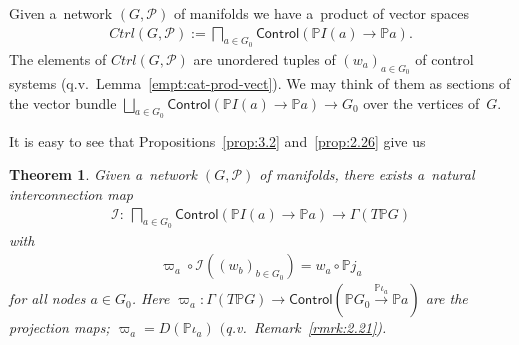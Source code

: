 \documentclass[10pt,a4paper]{amsart}
\numberwithin{equation}{section}
\newtheorem{Theorem}{Theorem}[section]
\renewcommand{\mathpzc}[1]{\mathit{#1}}
\begin{document}
\begin{Notation}
Given a~network $(G,{\mathcal P})$ of manifolds we have a~product of vector spaces
\begin{gather*}
\mathpzc{Ctrl}(G,{\mathcal P}):= \bigsqcap_{a\in G_0} \mathsf{Control}(\mathbb{P} I(a)\to \mathbb{P} a).
\end{gather*}
The elements of $\mathpzc{Ctrl}(G,{\mathcal P})$ are unordered tuples of $(w_a)_{a\in G_0}$ of control systems (q.v.\
Lem\-ma~\ref{empt:cat-prod-vect}).
We may think of them as sections of the vector bundle $\bigsqcup\limits_{a\in G_0}\mathsf{Control}(\mathbb{P} I(a)\to
\mathbb{P} a) \to G_0$ over the vertices of~$G$.
\end{Notation}
It is easy to see that Propositions~\ref{prop:3.2} and~\ref{prop:2.26} give us
\begin{Theorem}
\label{thm:3.8}
Given a~network $(G,{\mathcal P})$ of manifolds, there exists a~natural interconnection map
\begin{gather*}
\mathscr{I}\colon \ \bigsqcap_{a\in G_0} \mathsf{Control} (\mathbb{P} I(a)\to \mathbb{P} a) \to \Gamma (T\mathbb{P} G)
\end{gather*}
with
\begin{gather*}
\varpi_a \circ \mathscr{I} ((w_b)_{b\in G_0}) = w_a \circ \mathbb{P} j_a
\end{gather*}
for all nodes $a\in G_0$.
Here $\varpi_a\colon \Gamma (T\mathbb{P} G) \to \mathsf{Control}(\mathbb{P} G_0 \xrightarrow{\mathbb{P} \iota_a}
\mathbb{P} a)$ are the projection maps; $\varpi_a = D (\mathbb{P} \iota_a)$ $($q.v.~Remark~{\rm \ref{rmrk:2.21})}.
\end{Theorem}
\end{document}
